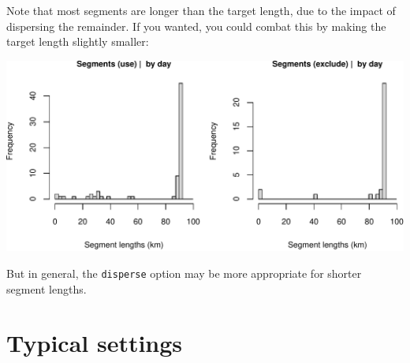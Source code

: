 \documentclass[
]{book}
\newenvironment{Shaded}{\begin{snugshade}}{\end{snugshade}}
\newcommand{\AttributeTok}[1]{\textcolor[rgb]{0.77,0.63,0.00}{#1}}
\newcommand{\CommentTok}[1]{\textcolor[rgb]{0.56,0.35,0.01}{\textit{#1}}}
\newcommand{\ConstantTok}[1]{\textcolor[rgb]{0.00,0.00,0.00}{#1}}
\newcommand{\DecValTok}[1]{\textcolor[rgb]{0.00,0.00,0.81}{#1}}
\newcommand{\FunctionTok}[1]{\textcolor[rgb]{0.00,0.00,0.00}{#1}}
\newcommand{\NormalTok}[1]{#1}
\newcommand{\OtherTok}[1]{\textcolor[rgb]{0.56,0.35,0.01}{#1}}
\newcommand{\SpecialCharTok}[1]{\textcolor[rgb]{0.00,0.00,0.00}{#1}}
\newcommand{\StringTok}[1]{\textcolor[rgb]{0.31,0.60,0.02}{#1}}
\begin{document}
Note that most segments are longer than the target length, due to the impact of dispersing the remainder. If you wanted, you could combat this by making the target length slightly smaller:

\begin{Shaded}
\end{Shaded}

\includegraphics{figures/unnamed-chunk-404-1.pdf}

But in general, the \texttt{disperse} option may be more appropriate for shorter segment lengths.

\hypertarget{typical-settings}{%
\section*{Typical settings}\label{typical-settings}}
\end{document}

